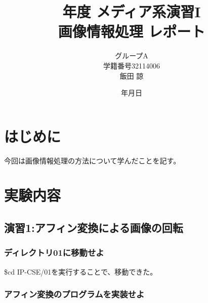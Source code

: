 ﻿\documentclass[a4j,11pt]{jarticle}
\title{{\number\year}年度 メディア系演習I\\ 画像情報処理 レポート}
\date{\number\year 年\number\month 月\number\day 日}
\author{グループA \\ 学籍番号32114006 \\ 飯田 諒}
\begin{document}
%
\maketitle
\clearpage
%
%
\section{はじめに}
%
%
今回は画像情報処理の方法について学んだことを記す。
%
%
\section{実験内容}
%
%
\subsection{演習1:アフィン変換による画像の回転}

\subsubsection{ディレクトリ01に移動せよ}
\$cd IP-CSE/01を実行することで、移動できた。
\subsubsection{アフィン変換のプログラムを実装せよ}

\end{document}
